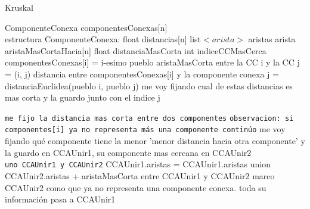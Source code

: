 \documentclass[11pt, a4paper, twoside]{article}
\begin{document}
\begin{algorithm}[H]
\caption{Kruskal}\label{alg:ej2-kruskal}
\footnotesize\begin{algorithmic}[1]

\State ComponenteConexa componentesConexas[n] 
\\
\State estructura ComponenteConexa: 
\State \hspace{0.15cm} float distancias[n]
\State \hspace{0.15cm} list$<arista>$ aristas
\State \hspace{0.15cm} arista aristaMasCortaHacia[n]
\State \hspace{0.15cm} float distanciaMasCorta
\State \hspace{0.15cm} int indiceCCMasCerca
\\

  
	\Statex \hspace{0.5cm} componentesConexas[i] = i-esimo pueblo 
        
        \State aristaMasCorta entre la CC i y la CC j = (i, j) 
        \State distancia entre componentesConexas[i] y la componente conexa j = distanciaEuclidea(pueblo i, pueblo j)  
        \State me voy fijando cual de estas distancias es mas corta y la guardo junto con el indice j  
	\EndFor
\EndFor
\\

  

	\Statex \hspace{0.5cm} \texttt{me fijo la distancia mas corta entre dos componentes}
       
        \Statex \hspace{0.9cm} \texttt{observacion: si componentes[i] ya no representa más una componente continúo}
        \State me voy fijando qué componente tiene la menor 'menor distancia hacia otra componente' 
		y la guardo en CCAUnir1, su componente mas cercana en CCAUnir2 
	\EndFor	
	\\
	
	\Statex \hspace{0.5cm} \texttt{uno CCAUnir1 y CCAUnir2}
	\State CCAUnir1.aristas = CCAUnir1.aristas union CCAUnir2.aristas + aristaMasCorta entre CCAUnir1 y CCAUnir2 
    \State marco CCAUnir2 como que ya no representa una componente conexa. toda su información pasa a CCAUnir1  
	\\
	

\end{algorithmic}
\end{algorithm}
\end{document}
